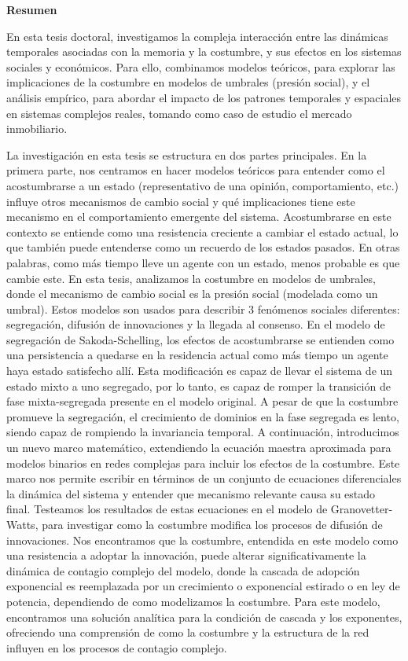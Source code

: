 \pagebreak
\thispagestyle{empty}
\textbf{ \huge Resumen}

\vspace*{0.5cm}

En esta tesis doctoral, investigamos la compleja interacción entre las dinámicas temporales asociadas con la memoria y la costumbre, y sus efectos en los sistemas sociales y económicos. Para ello, combinamos modelos teóricos, para explorar las implicaciones de la costumbre en modelos de umbrales (presión social), y el análisis empírico, para abordar el impacto de los patrones temporales y espaciales en sistemas complejos reales, tomando como caso de estudio el mercado inmobiliario.

La investigación en esta tesis se estructura en dos partes principales. En la primera parte, nos centramos en hacer modelos teóricos para entender como el acostumbrarse a un estado (representativo de una opinión, comportamiento, etc.) influye otros mecanismos de cambio social y qué implicaciones tiene este mecanismo en el comportamiento emergente del sistema. Acostumbrarse en este contexto se entiende como una resistencia creciente a cambiar el estado actual, lo que también puede entenderse como un recuerdo de los estados pasados. En otras palabras, como más tiempo lleve un agente con un estado, menos probable es que cambie este. En esta tesis, analizamos la costumbre en modelos de umbrales, donde el mecanismo de cambio social es la presión social (modelada como un umbral). Estos modelos son usados para describir 3 fenómenos sociales diferentes: segregación, difusión de innovaciones y la llegada al consenso. En el modelo de segregación de Sakoda-Schelling, los efectos de acostumbrarse se entienden como una persistencia a quedarse en la residencia actual como más tiempo un agente haya estado satisfecho allí. Esta modificación es capaz de llevar el sistema de un estado mixto a uno segregado, por lo tanto, es capaz de romper la transición de fase mixta-segregada presente en el modelo original. A pesar de que la costumbre promueve la segregación, el crecimiento de dominios en la fase segregada es lento, siendo capaz de rompiendo la invariancia temporal. A continuación, introducimos un nuevo marco matemático, extendiendo la ecuación maestra aproximada para modelos binarios en redes complejas para incluir los efectos de la costumbre. Este marco nos permite escribir en términos de un conjunto de ecuaciones diferenciales la dinámica del sistema y entender que mecanismo relevante causa su estado final. Testeamos los resultados de estas ecuaciones en el modelo de Granovetter-Watts, para investigar como la costumbre modifica los procesos de difusión de innovaciones. Nos encontramos que la costumbre, entendida en este modelo como una resistencia a adoptar la innovación, puede alterar significativamente la dinámica de contagio complejo del modelo, donde la cascada de adopción exponencial es reemplazada por un crecimiento o exponencial estirado o en ley de potencia, dependiendo de como modelizamos la costumbre. Para este modelo, encontramos una solución analítica para la condición de cascada y los exponentes, ofreciendo una comprensión de como la costumbre y la estructura de la red influyen en los procesos de contagio complejo. 